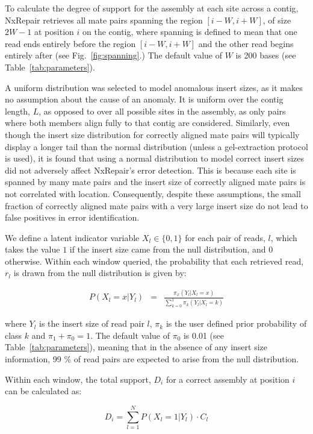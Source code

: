To calculate the degree of support for the assembly at each site across a contig, NxRepair retrieves all mate pairs spanning the region $[i-W, i+W]$, of size $2W-1$ at position $i$ on the contig, where spanning is defined to mean that one read ends entirely before the region $[i-W, i+W]$ and the other read begins entirely after (see Fig.~\ref{fig:spanning}.) The default value of $W$ is 200 bases (see Table~\ref{tab:parameters}). 

A uniform distribution was selected to model anomalous insert sizes, as it makes no assumption about the cause of an anomaly. It is uniform over the contig length, $L$, as opposed to over all possible sites in the assembly, as only pairs where both members align fully to that contig are considered. Similarly, even though the insert size distribution for correctly aligned mate pairs will typically display a longer tail than the normal distribution (unless a gel-extraction protocol is used), it is found that using a normal distribution to model correct insert sizes did not adversely affect NxRepair's error detection. This is because each site is spanned by many mate pairs and the insert size of correctly aligned mate pairs is not correlated with location. Consequently, despite these assumptions, the small fraction of correctly aligned mate pairs with a very large insert size do not lead to false positives in error identification. 

We define a latent indicator variable $X_l\in\{0,1\}$ for each pair of reads, $l$, which takes the value $1$ if the insert size came from the null distribution, and $0$ otherwise. Within each window queried, the probability that each retrieved read, $r_l$ is drawn from the null distribution is given by:

\begin{eqnarray} P(X_l=x|Y_l)& =& \frac{\pi_x(Y_l|X_l=x)}{\sum_{k=0}^1 \pi_k(Y_l|X_l=k)}
\label{eq:posterior}  
\end{eqnarray}

where $Y_l$ is the insert size of read pair $l$, $\pi_k$ is the user defined prior probability of class $k$ and $\pi_1 + \pi_0 = 1$. The default value of $\pi_0$ is 0.01 (see Table~\ref{tab:parameters}), meaning that in the absence of any insert size information, 99 \% of read pairs are expected to arise from the null distribution.  

Within each window, the total support, $D_i$ for a correct assembly at position $i$ can be calculated as:

\begin{equation}
D_i = \sum_{l=1}^N P(X_l=1|Y_l)\cdot C_l
\end{equation}

